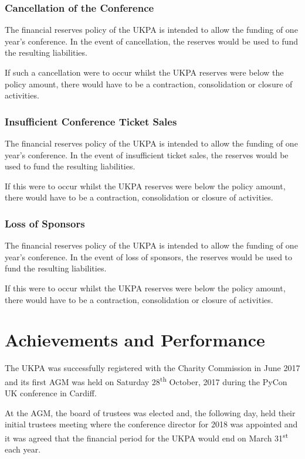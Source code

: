 \documentclass[11pt, final]{article}
\begin{document}
            \subsubsection{Cancellation of the Conference}
            The financial reserves policy of the UKPA is intended to allow the funding of one year's conference. In the event of cancellation, the reserves would be used to fund the resulting liabilities.
            
            If such a cancellation were to occur whilst the UKPA reserves were below the policy amount, there would have to be a contraction, consolidation or closure of activities.
            
            \subsubsection{Insufficient Conference Ticket Sales}
            The financial reserves policy of the UKPA is intended to allow the funding of one year's conference. In the event of insufficient ticket sales, the reserves would be used to fund the resulting liabilities.
            
            If this were to occur whilst the UKPA reserves were below the policy amount, there would have to be a contraction, consolidation or closure of activities.
              
            \subsubsection{Loss of Sponsors}
            The financial reserves policy of the UKPA is intended to allow the funding of one year's conference. In the event of loss of sponsors, the reserves would be used to fund the resulting liabilities.
            
            If this were to occur whilst the UKPA reserves were below the policy amount, there would have to be a contraction, consolidation or closure of activities.

    \section{Achievements and Performance}
        The UKPA was successfully registered with the Charity Commission in June 2017 and its first AGM was held on Saturday 28\textsuperscript{th} October, 2017 during the PyCon UK conference in Cardiff.
        
        At the AGM, the board of trustees was elected and, the following day, held their initial trustees meeting where the conference director for 2018 was appointed and it was agreed that the financial period for the UKPA would end on March 31\textsuperscript{st} each year. 
        
\end{document}
